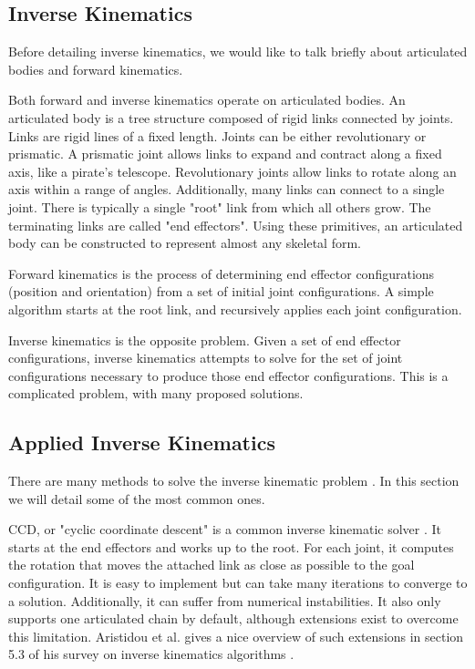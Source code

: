 \documentclass{vgtc}                          %
\begin{document}
\subsection{Inverse Kinematics}
    
    Before detailing inverse kinematics, we would like to talk briefly about articulated bodies and forward kinematics.

    Both forward and inverse kinematics operate on articulated bodies. An articulated body is a tree structure composed of rigid links connected by joints. Links are rigid lines of a fixed length. Joints can be either revolutionary or prismatic. A prismatic joint allows links to expand and contract along a fixed axis, like a pirate's telescope. Revolutionary joints allow links to rotate along an axis within a range of angles. Additionally, many links can connect to a single joint. There is typically a single "root" link from which all others grow. The terminating links are called "end effectors". Using these primitives, an articulated body can be constructed to represent almost any skeletal form. 
    
    Forward kinematics is the process of determining end effector configurations (position and orientation) from a set of initial joint configurations. A simple algorithm starts at the root link, and recursively applies each joint configuration.

    Inverse kinematics is the opposite problem. Given a set of end effector configurations, inverse kinematics attempts to solve for the set of joint configurations necessary to produce those end effector configurations. This is a complicated problem, with many proposed solutions.
    
\subsection{Applied Inverse Kinematics}
    
    There are many methods to solve the inverse kinematic problem \cite{IkTechniques}. In this section we will detail some of the most common ones.
    
    CCD, or "cyclic coordinate descent" is a common inverse kinematic solver \cite{CCD}. It starts at the end effectors and works up to the root.  For each joint, it computes the rotation that moves the attached link as close as possible to the goal configuration. It is easy to implement but can take many iterations to converge to a solution. Additionally, it can suffer from numerical instabilities. It also only supports one articulated chain by default, although extensions exist to overcome this limitation. Aristidou et al. gives a nice overview of such extensions in section 5.3 of his survey on inverse kinematics algorithms \cite{IkTechniques}. 
    
\end{document}
